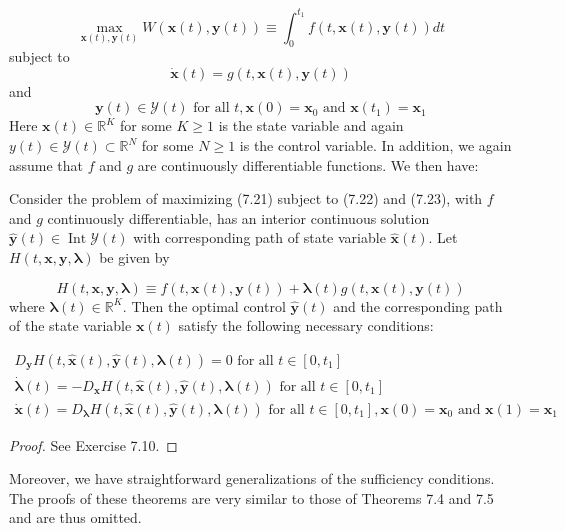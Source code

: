 \documentclass[\topdir/lecture_notes.tex]{subfiles}
\begin{document}
\[
\max _{\mathbf{x}(t), \mathbf{y}(t)} W(\mathbf{x}(t), \mathbf{y}(t)) \equiv \int_{0}^{t_{1}} f(t, \mathbf{x}(t), \mathbf{y}(t)) d t
\]
subject to
\[
\dot{\mathbf{x}}(t)=g(t, \mathbf{x}(t), \mathbf{y}(t))
\]
and
\[
\mathbf{y}(t) \in \mathcal{Y}(t) \text { for all } t, \mathbf{x}(0)=\mathbf{x}_{0} \text { and } \mathbf{x}\left(t_{1}\right)=\mathbf{x}_{1}
\]
Here $\mathbf{x}(t) \in \mathbb{R}^{K}$ for some $K \geq 1$ is the state variable and again $y(t) \in \mathcal{Y}(t) \subset \mathbb{R}^{N}$ for some $N \geq 1$ is the control variable. In addition, we again assume that $f$ and $g$ are continuously differentiable functions. We then have:

\begin{theorem}
Consider the problem of maximizing (7.21) subject to (7.22) and (7.23), with $f$ and $g$ continuously differentiable, has an interior continuous solution $\hat{\mathbf{y}}(t) \in \operatorname{Int} \mathcal{Y}(t)$ with corresponding path of state variable $\hat{\mathbf{x}}(t)$. Let $H(t, \mathbf{x}, \mathbf{y}, \boldsymbol{\lambda})$ be given by

\[
H(t, \mathbf{x}, \mathbf{y}, \boldsymbol{\lambda}) \equiv f(t, \mathbf{x}(t), \mathbf{y}(t))+\boldsymbol{\lambda}(t) g(t, \mathbf{x}(t), \mathbf{y}(t))
\]
where $\boldsymbol{\lambda}(t) \in \mathbb{R}^{K}$. Then the optimal control $\hat{\mathbf{y}}(t)$ and the corresponding path of the state variable $\mathbf{x}(t)$ satisfy the following necessary conditions:

\[
\begin{gathered}
D_{\mathbf{y}} H(t, \hat{\mathbf{x}}(t), \hat{\mathbf{y}}(t), \boldsymbol{\lambda}(t))=0 \text { for all } t \in\left[0, t_{1}\right] \\
\dot{\boldsymbol{\lambda}}(t)=-D_{\mathbf{x}} H(t, \hat{\mathbf{x}}(t), \hat{\mathbf{y}}(t), \boldsymbol{\lambda}(t)) \text { for all } t \in\left[0, t_{1}\right] \\
\dot{\mathbf{x}}(t)=D_{\boldsymbol{\lambda}} H(t, \hat{\mathbf{x}}(t), \hat{\mathbf{y}}(t), \boldsymbol{\lambda}(t)) \text { for all } t \in\left[0, t_{1}\right], \mathbf{x}(0)=\mathbf{x}_{0} \text { and } \mathbf{x}(1)=\mathbf{x}_{1}
\end{gathered}
\]
\end{theorem}

\begin{proof}
See Exercise 7.10.
\end{proof}
Moreover, we have straightforward generalizations of the sufficiency conditions. The proofs of these theorems are very similar to those of Theorems 7.4 and 7.5 and are thus omitted.
\end{document}
